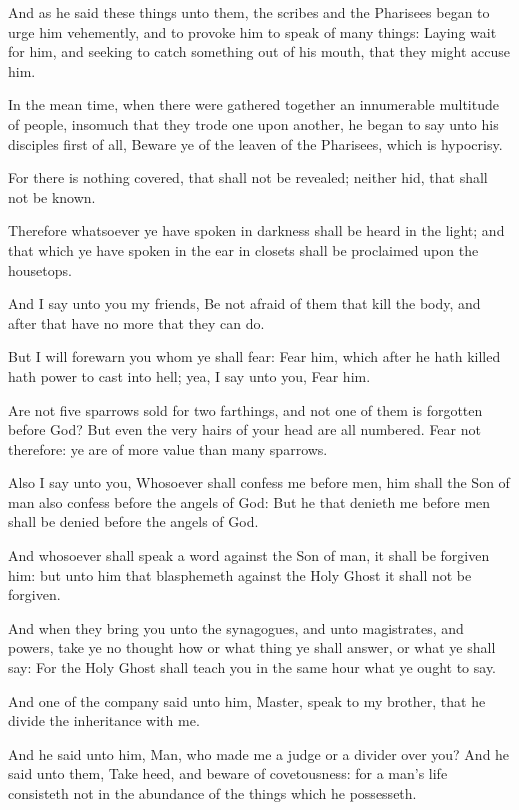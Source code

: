 \Verse And as he said these things unto them, the scribes and the Pharisees began to urge him vehemently, and to provoke him to speak of many things: \Verse Laying wait for him, and seeking to catch something out of his mouth, that they might accuse him.


\Chapter
\Verse In the mean time, when there were gathered together an innumerable multitude of people, insomuch that they trode one upon another, he began to say unto his disciples first of all, Beware ye of the leaven of the Pharisees, which is hypocrisy.

\Verse For there is nothing covered, that shall not be revealed; neither hid, that shall not be known.

\Verse Therefore whatsoever ye have spoken in darkness shall be heard in the light; and that which ye have spoken in the ear in closets shall be proclaimed upon the housetops.

\Verse And I say unto you my friends, Be not afraid of them that kill the body, and after that have no more that they can do.

\Verse But I will forewarn you whom ye shall fear: Fear him, which after he hath killed hath power to cast into hell; yea, I say unto you, Fear him.

\Verse Are not five sparrows sold for two farthings, and not one of them is forgotten before God?  \Verse But even the very hairs of your head are all numbered. Fear not therefore: ye are of more value than many sparrows.

\Verse Also I say unto you, Whosoever shall confess me before men, him shall the Son of man also confess before the angels of God: \Verse But he that denieth me before men shall be denied before the angels of God.

\Verse And whosoever shall speak a word against the Son of man, it shall be forgiven him: but unto him that blasphemeth against the Holy Ghost it shall not be forgiven.

\Verse And when they bring you unto the synagogues, and unto magistrates, and powers, take ye no thought how or what thing ye shall answer, or what ye shall say: \Verse For the Holy Ghost shall teach you in the same hour what ye ought to say.

\Verse And one of the company said unto him, Master, speak to my brother, that he divide the inheritance with me.

\Verse And he said unto him, Man, who made me a judge or a divider over you?  \Verse And he said unto them, Take heed, and beware of covetousness: for a man's life consisteth not in the abundance of the things which he possesseth.


